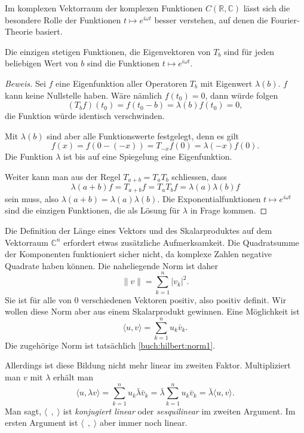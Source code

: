 Im komplexen Vektorraum der komplexen Funktionen $C(\mathbb R,\mathbb C)$
lässt sich die besondere Rolle der Funktionen $t\mapsto e^{i\omega t}$ 
besser verstehen, auf denen die Fourier-Theorie basiert.

\begin{satz}
Die einzigen stetigen Funktionen, die Eigenvektoren von $T_b$ sind für
jeden beliebigen Wert von $b$ sind die Funktionen $t\mapsto e^{i\omega t}$.
\end{satz}

\begin{proof}[Beweis]
Sei $f$ eine Eigenfunktion aller Operatoren $T_b$ mit Eigenwert $\lambda(b)$.
$f$ kann keine Nullstelle haben.
Wäre nämlich $f(t_0)=0$, dann würde folgen
\[
(T_bf)(t_0) = f(t_0-b) = \lambda(b) f(t_0) = 0,
\]
die Funktion würde identisch verschwinden.

Mit $\lambda(b)$ sind aber alle Funktionswerte festgelegt, denn es 
gilt
\[
f(x) = f(0-(-x)) = T_{-x}f(0) = \lambda(-x) f(0).
\]
Die Funktion $\lambda$ ist bis auf eine Spiegelung eine Eigenfunktion.

Weiter kann man aus der Regel $T_{a+b}=T_aT_b$ schliessen, dass
\[
\lambda(a+b) f
=
T_{a+b}f
=
T_aT_bf
=
\lambda(a)\lambda(b)f
\]
sein muss, also  $\lambda(a+b)=\lambda(a)\lambda(b)$.
Die Exponentialfunktionen $t\mapsto e^{i\omega t}$ sind die einzigen
Funktionen, die als Lösung für $\lambda$ in Frage kommen.
\end{proof}

Die Definition der Länge eines Vektors und des Skalarproduktes auf dem
Vektorraum $\mathbb C^n$ erfordert etwas zusätzliche Aufmerksamkeit.
Die Quadratsumme der Komponenten funktioniert sicher nicht, da komplexe
Zahlen negative Quadrate haben können.
Die naheliegende Norm ist daher
\begin{equation}
\|v\| = \sum_{k=1}^n |v_k|^2.
\label{buch:hilbert:norm1}
\end{equation}
Sie ist für alle von $0$ verschiedenen Vektoren positiv, also positiv
definit.
Wir wollen diese Norm aber aus einem Skalarprodukt gewinnen.
Eine Möglichkeit ist
\begin{equation}
\langle u,v\rangle = \sum_{k=1}^n u_k\bar{v}_k.
\label{hilbert:skalaransatz}
\end{equation}
Die zugehörige Norm ist tatsächlich \eqref{buch:hilbert:norm1}.

Allerdings ist diese Bildung nicht mehr linear im zweiten Faktor.
Multipliziert man $v$ mit $\lambda$ erhält man
\[
\langle u,\lambda v\rangle
=
\sum_{k=1}^n u_k\bar{\lambda} \bar{v}_k
=
\bar{\lambda}\sum_{k=1}^n u_k\bar{v}_k
=
\bar{\lambda}\langle u,v\rangle.
\]
Man sagt, $\langle\;\,,\;\rangle$ ist {\em konjugiert linear} oder
{\em sesquilinear} im zweiten Argument.
%
%
Im ersten Argument ist $\langle\;\,,\;\rangle$ aber immer noch linear.


